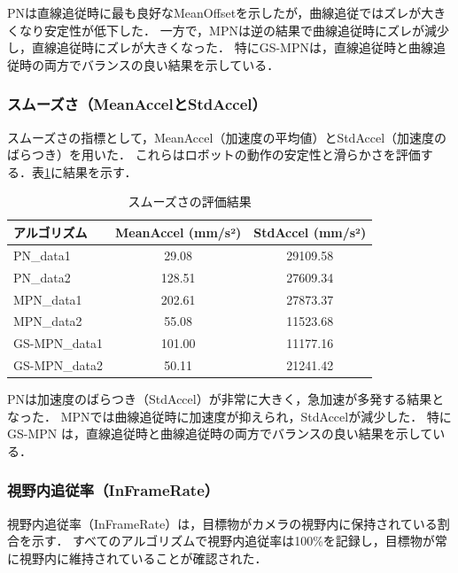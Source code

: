 PNは直線追従時に最も良好なMeanOffsetを示したが，曲線追従ではズレが大きくなり安定性が低下した．
一方で，MPNは逆の結果で曲線追従時にズレが減少し，直線追従時にズレが大きくなった．
特にGS-MPNは，直線追従時と曲線追従時の両方でバランスの良い結果を示している．

\subsubsection{スムーズさ（MeanAccelとStdAccel）}
スムーズさの指標として，MeanAccel（加速度の平均値）とStdAccel（加速度のばらつき）を用いた．
これらはロボットの動作の安定性と滑らかさを評価する．表\ref{tab:accel_results}に結果を示す．

\begin{table}[H]
    \centering
    \caption{スムーズさの評価結果}
    \label{tab:accel_results}
    \begin{tabular}{|l|c|c|}
        \hline
        \textbf{アルゴリズム} & \textbf{MeanAccel (mm/s²)} & \textbf{StdAccel (mm/s²)} \\ \hline
        PN\_data1             & 29.08                      & 29109.58                  \\ \hline
        PN\_data2             & 128.51                     & 27609.34                  \\ \hline
        MPN\_data1            & 202.61                     & 27873.37                  \\ \hline
        MPN\_data2            & 55.08                      & 11523.68                  \\ \hline
        GS-MPN\_data1         & 101.00                     & 11177.16                  \\ \hline
        GS-MPN\_data2         & 50.11                      & 21241.42                  \\ \hline
    \end{tabular}
\end{table}

PNは加速度のばらつき（StdAccel）が非常に大きく，急加速が多発する結果となった．
MPNでは曲線追従時に加速度が抑えられ，StdAccelが減少した．
特に GS-MPN は，直線追従時と曲線追従時の両方でバランスの良い結果を示している．

\subsubsection{視野内追従率（InFrameRate）}
視野内追従率（InFrameRate）は，目標物がカメラの視野内に保持されている割合を示す．
すべてのアルゴリズムで視野内追従率は100\%を記録し，目標物が常に視野内に維持されていることが確認された．

